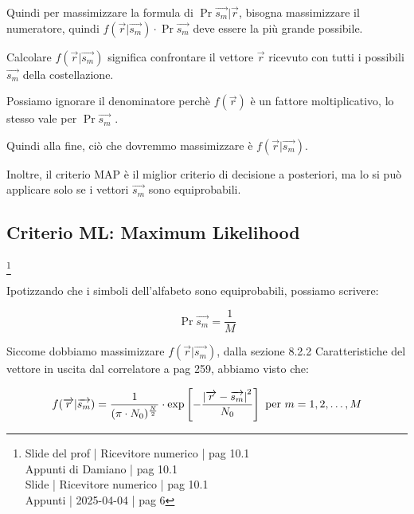 Quindi per massimizzare la formula di $ \Pr {\overrightarrow{s_m} | \overrightarrow{r}}$, 
bisogna massimizzare il numeratore, 
quindi $f (\overrightarrow{r} | \overrightarrow{s_m}) \cdot \Pr {\overrightarrow{s_m}}$ deve essere la più grande possibile. \newline 

Calcolare $f (\overrightarrow{r} | \overrightarrow{s_m})$ significa confrontare il vettore $\overrightarrow{r}$ ricevuto con tutti i possibili $\overrightarrow{s_m}$ della costellazione. \newline 

Possiamo ignorare il denominatore perchè $f(\overrightarrow{r})$ è un fattore moltiplicativo, 
lo stesso vale per $\Pr {\overrightarrow{s_m}}$ . \newline 

Quindi alla fine, ciò che dovremmo massimizzare è $f (\overrightarrow{r} | \overrightarrow{s_m})$. \newline 

Inoltre, il criterio MAP è il miglior criterio di decisione a posteriori, 
ma lo si può applicare solo se i vettori $\overrightarrow{s_m}$ sono equiprobabili. \newline 

\newpage 

\subsection{Criterio ML: Maximum Likelihood}
\footnote{Slide del prof | Ricevitore numerico | pag 10.1 \\  
Appunti di Damiano | pag 10.1 \\
Slide | Ricevitore numerico | pag 10.1 \\
Appunti | 2025-04-04 | pag 6
}

Ipotizzando che i simboli dell'alfabeto sono equiprobabili, 
possiamo scrivere: 

{
    \Large 
    \begin{equation}
        \Pr{\overrightarrow{s_m}}
        = 
        \frac{1}{M}
    \end{equation}
}

Siccome dobbiamo massimizzare $f (\overrightarrow{r} | \overrightarrow{s_m})$, 
dalla sezione 8.2.2 Caratteristiche del vettore in uscita dal correlatore a pag 259, 
abbiamo visto che: 

{
    \Large 
    \begin{equation}
        f(\overrightarrow{r} | \overrightarrow{s_m})
        =
         \frac{1}{(\pi \cdot N_0)^{\frac{N}{2}}}
        \cdot 
        \exp \left[- \frac{\abs{\overrightarrow{r} - \overrightarrow{s_m}}^{2}}{N_0} \right]
        \text{ per }
        m = 1, 2, \dots, M
    \end{equation}
}

